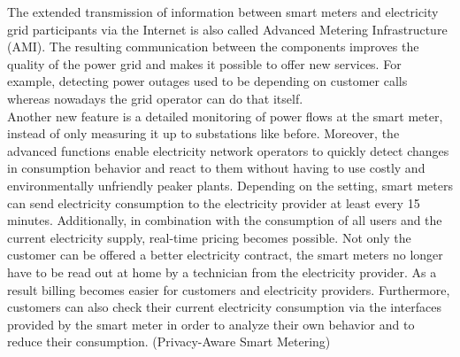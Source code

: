 The extended transmission of information between smart meters and electricity grid participants via the Internet is also called Advanced Metering Infrastructure (AMI). The resulting communication between the components improves the quality of the power grid and makes it possible to offer new services. For example, detecting power outages used to be depending on customer calls whereas nowadays the grid operator can do that itself.\\
Another new feature is a detailed monitoring of power flows at the smart meter, instead of only measuring it up to substations like before. Moreover, the advanced functions enable electricity network operators to quickly detect changes in consumption behavior and react to them without having to use costly and environmentally unfriendly peaker plants. Depending on the setting, smart meters can send electricity consumption to the electricity provider at least every 15 minutes. Additionally, in combination with the consumption of all users and the current electricity supply, real-time pricing becomes possible. Not only the customer can be offered a better electricity contract, the smart meters no longer have to be read out at home by a technician from the electricity provider. As a result billing becomes easier for customers and electricity providers. Furthermore, customers can also check their current electricity consumption via the interfaces provided by the smart meter in order to analyze their own behavior and to reduce their consumption. (Privacy-Aware Smart Metering)
